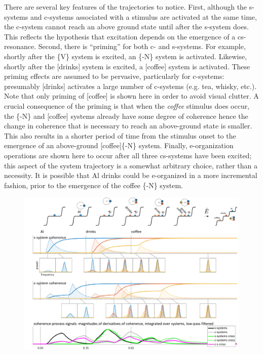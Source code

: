   There are several key features of the trajectories to notice. First, although the s-systems and c-systems associated with a stimulus are activated at the same time, the c-system cannot reach an above ground state until after the s-system does. This reflects the hypothesis that excitation depends on the emergence of a cs-resonance. Second, there is “priming” for both c- and s-systems. For example, shortly after the \{V\} system is excited, an \{-N\} system is activated. Likewise, shortly after the [drinks] system is excited, a [coffee] system is activated. These priming effects are assumed to be pervasive, particularly for c-systems: presumably [drinks] activates a large number of c-systems (e.g. tea, whisky, etc.). Note that only priming of [coffee] is shown here in order to avoid visual clutter. A crucial consequence of the priming is that when the \textit{coffee} stimulus does occur, the \{-N\} and [coffee] systems already have some degree of coherence hence the change in coherence that is necessary to reach an above-ground state is smaller. This also results in a shorter period of time from the stimulus onset to the emergence of an above-ground [coffee]\{-N\} system. Finally, e-organization operations are shown here to occur after all three cs-systems have been excited; this aspect of the system trajectory is a somewhat arbitrary choice, rather than a necessity. It is possible that {\textbar}Al drinks{\textbar} could be e-organized in a more incremental fashion, prior to the emergence of the {\textbar}coffee \{-N\}{\textbar} system. 

  
\begin{figure}
\includegraphics[width=\textwidth]{figures/Tilsen-img141.png}
\caption{\missingcaption}
\label{fig:}
\end{figure}
 


